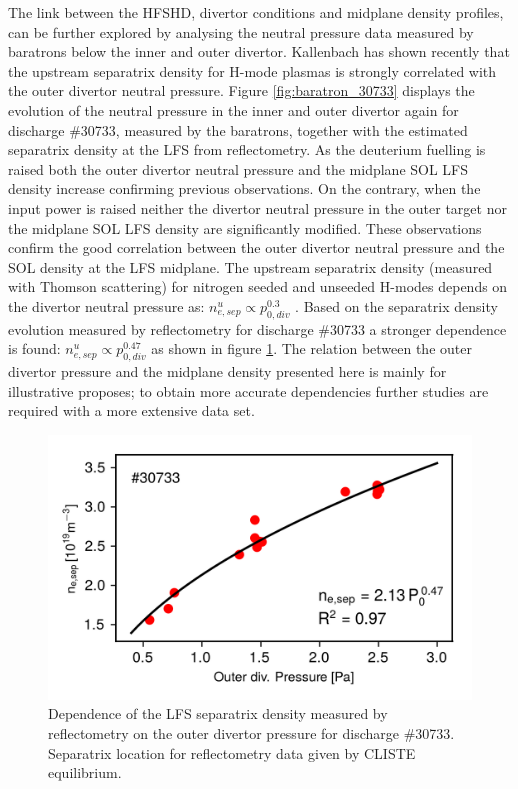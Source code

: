 \documentclass[12pt]{iopart}
\begin{document}
The link between the HFSHD, divertor conditions and midplane density profiles, can be further explored by analysing the neutral pressure data measured by baratrons below the inner and outer divertor. Kallenbach has shown recently\cite{kallenbach2018parameter} that the upstream separatrix density for H-mode plasmas is strongly correlated with the outer divertor neutral pressure. Figure \ref{fig:baratron_30733} displays the evolution of the neutral pressure in the inner and outer divertor again for discharge \#30733, measured by the baratrons, together with the estimated separatrix density at the LFS from reflectometry. As the deuterium fuelling is raised both the outer divertor neutral pressure and the midplane SOL LFS density increase confirming previous observations. On the contrary, when the input power is raised neither the divertor neutral pressure in the outer target nor the midplane SOL LFS density are significantly modified. These observations confirm the good correlation between the outer divertor neutral pressure and the SOL density at the LFS midplane. The upstream separatrix density (measured with Thomson scattering) for nitrogen seeded and unseeded H-modes depends on the divertor neutral pressure as: $n_{e,sep}^u \propto p_{0,div}^{0.3}$ 
\cite{kallenbach2018parameter}. Based on the separatrix density evolution measured by reflectometry for discharge \#30733 a stronger dependence is found: $n_{e,sep}^u \propto p_{0,div}^{0.47}$ as shown in figure \ref{fig:nsep_pzero}. The relation between the outer divertor pressure and the midplane density presented here is mainly for illustrative proposes; to obtain more accurate dependencies further studies are required with a more extensive data set.

\begin{figure}[!bt]
\centering
\includegraphics[]{nsep_pzero.png}
\caption[Dependence of the LFS separatrix density on the outer divertor pressure for discharge \#30733.]{Dependence of the LFS separatrix density measured by reflectometry on the outer divertor pressure for discharge \#30733. Separatrix location for reflectometry data given by CLISTE equilibrium\cite{mccarthy1999cliste}.}
\label{fig:nsep_pzero}
\end{figure}
\end{document}
